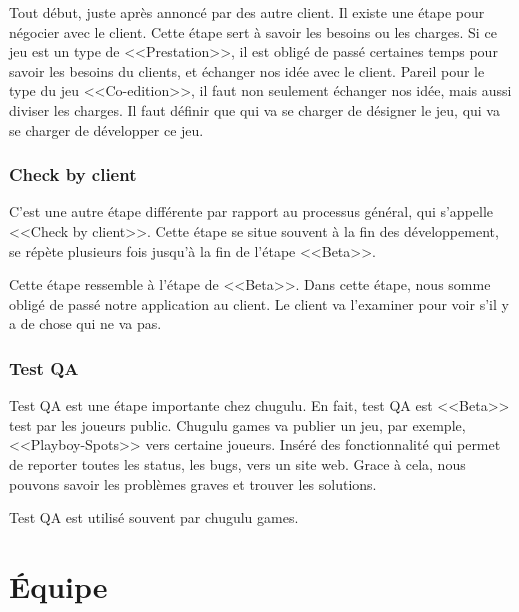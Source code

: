 Tout début, juste après annoncé par des autre client. Il existe une étape pour négocier avec le client. Cette étape sert à savoir les besoins ou les charges. Si ce jeu est un type de <<Prestation>>, il est obligé de passé certaines temps pour savoir les besoins du clients, et échanger nos idée avec le client. Pareil pour le type du jeu <<Co-edition>>, il faut non seulement échanger nos idée, mais aussi diviser les charges. Il faut définir que qui va se charger de désigner le jeu, qui va se charger de développer ce jeu.


\subsubsection{Check by client} %
\label{ssub:check_by_client}

C'est une autre étape différente par rapport au processus général, qui s'appelle <<Check by client>>. Cette étape se situe souvent à la fin des développement, se répète plusieurs fois jusqu'à la fin de l'étape <<Beta>>. 

Cette étape ressemble à l'étape de <<Beta>>. Dans cette étape, nous somme obligé de passé notre application au client. Le client va l'examiner pour voir s'il y a de chose qui ne va pas.


\subsubsection{Test QA} %
\label{ssub:test_qa}

Test QA est une étape importante chez chugulu. En fait, test QA est <<Beta>> test par les joueurs public. Chugulu games va publier un jeu, par exemple, <<Playboy-Spots>> vers certaine joueurs. Inséré des fonctionnalité qui permet de reporter toutes les status, les bugs, vers un site web. Grace à cela, nous pouvons savoir les problèmes graves et trouver les solutions.

Test QA est utilisé souvent par chugulu games.  


\section{Équipe} %
\label{sec:Équipe}

